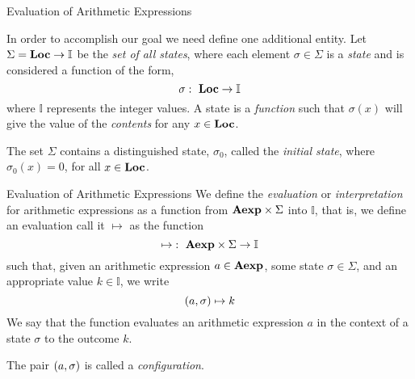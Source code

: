 \documentclass{beamer}
\begin{document}
\begin{frame}{\large Evaluation of Arithmetic Expressions}

In order to accomplish our goal we need define one additional entity.  Let $\Sigma = \mbox{\bf Loc} \rightarrow \mathbb{I}$  be the {\em set of all states}, where each element $\sigma \in \Sigma$ is a {\em state} and is considered
a function of the form,
\[
\sigma\,\colon\; \mbox{\bf Loc} \rightarrow \mathbb{I}
\]
where $\mathbb{I}$ represents the integer values.
A state is a {\em function} such that $\sigma(x)$ will give the value of the {\em contents}
for any $x \in \mbox{\bf Loc}$.

\vspace{.1in}

The set $\Sigma$ contains a distinguished state, $\sigma_0$, called the {\em initial state}, where $\sigma_0(x) = 0$, for all $x \in \mbox{\bf Loc}$.

\end{frame}



\begin{frame}{\large Evaluation of Arithmetic Expressions}
We define the {\em evaluation}  or {\em interpretation} for arithmetic expressions as a function
from $\mbox{\bf Aexp} \times \Sigma$ into $\mathbb{I}$, that is, we define an evaluation
call it $\mapsto$ as the function
\[
\mapsto \,\colon\; \mbox{\bf Aexp} \times \Sigma \rightarrow \mathbb{I}
\]
such that, given an arithmetic expression $a \in \mbox{\bf Aexp}$, some state $\sigma \in \Sigma$, and
an appropriate value $k \in \mathbb{I}$, we write
\[
({a}, {\sigma} ) \mapsto k
\]
We say that the function evaluates an arithmetic expression  $a$ in the context of a state $\sigma$ to
the outcome $k$.

\vspace{.1in}

The pair $({a}, {\sigma} )$ is called a {\em configuration}.

\end{frame}
\end{document}
